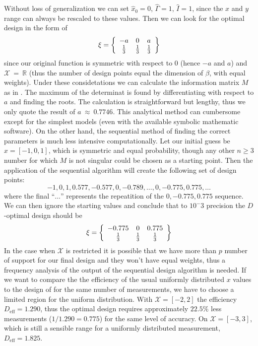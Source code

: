 \documentclass[12pt]{iopart}
\begin{document}
Without loss of generalization we can set $\hat x_0 = 0$, $\hat \Gamma = 1$, $\hat I = 1$, since the $x$ and $y$ range can always be rescaled to these values. Then we can look for the optimal design in the form of
\begin{equation}
\xi = \left\{
  \begin{array}{c c c}
    -a & 0 & a\\
    \frac{1}{3} & \frac{1}{3} & \frac{1}{3}\\
  \end{array} \right \}
\end{equation}
since our original function is symmetric with respect to 0 (hence $-a$ and $a$) and $\mathcal{X}~=~\mathbb{R}$ (thus the number of design points equal the dimension of $\beta$, with equal weights). Under these considetations we can calculate the information matrix $M$ as in . The maximum of the determinat is found by differentiating with respect to $a$ and finding the roots. The calculation is straightforward but lengthy, thus we only quote the result of $a~\approx~0.7746$. This analytical method can cumbersome except for the simplest models (even with the available symbolic mathematic software). On the other hand, the sequential method of finding the correct parameters is much less intensive computationally. Let our initial guess be $x = [-1, 0, 1]$, which is symmetric and equal probability, though any other $n \geq 3$ number for which $M$ is not singular could be chosen as a starting point. Then the application of the sequential algorithm will create the following set of design points:
\begin{equation}
    -1, 0, 1, 0.577, -0.577, 0, -0.789,\ldots,0,-0.775,0.775,\ldots
\label{eq:l3seq}
\end{equation}
where the final ``$\ldots$'' represents the repeatition of the $0,-0.775,0.775$ sequence. We can then ignore the starting values and conclude that to $10^-3$ precision the $D$-optimal design should be
\begin{equation}
\xi = \left\{
  \begin{array}{c c c}
    -0.775 & 0 & 0.775\\
    \frac{1}{3} & \frac{1}{3} & \frac{1}{3}\\
  \end{array} \right \}
\label{eq:lorentzxi1}
\end{equation}
In the case when $\mathcal{X}$ is restricted it is possible that we have more than $p$ number of support for our final design and they won't have equal weights, thus a frequency analysis of the output of the sequential design algorithm is needed.
If we want to compare the the efficiency of the usual uniformly distributed $x$ values to the design of  for the same number of measurements, we have to choose a limited region for the uniform distribution. With $\mathcal{X} = [-2, 2]$ the efficiency $D_\mathrm{eff} = 1.290$, thus the optimal design requires approximately $22.5\%$ less measurements ($1/1.290 = 0.775$) for the same level of accuracy. On $\mathcal{X} =[-3, 3]$, which is still a sensible range for a uniformly distributed measurement, $D_\mathrm{eff} = 1.825$.
\end{document}
